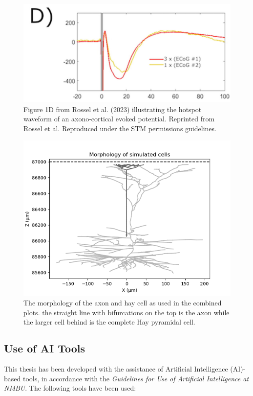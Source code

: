 \documentclass[final, a4paper,masters,en,listoffigures,listoftables,norwegiandates]{NMBU}
\begin{document}
\begin{figure}[htbp]
    \centering
    \includegraphics[width=\linewidth]{Figures/Rosselfig1d.jpg}
    \caption[ACEP waveform hotspot (Rossel et al., 2023) ]{%
    Figure 1D from Rossel et al. (2023) illustrating the hotspot waveform of an axono-cortical evoked potential.%
    \footnotesize Reprinted from Rossel et al. \cite{ROSSEL2023} Reproduced under the STM permissions guidelines.
    }
    \label{fig:rossel}
\end{figure}

\begin{figure}[htbp]
    \centering
    \includegraphics[width=\linewidth]{Figures/singlecombined.png}
    \caption{The morphology of the axon and hay cell as used in the combined plots. the straight line with bifurcations on the top is the axon while the larger cell behind is the complete Hay pyramidal cell.}
    \label{fig:combinedmorph}
\end{figure}

\newpage
\subsection{Use of AI Tools}
This thesis has been developed with the assistance of Artificial Intelligence (AI)-based tools, in accordance with the \textit{Guidelines for Use of Artificial Intelligence at NMBU}. The following tools have been used:
\end{document}
